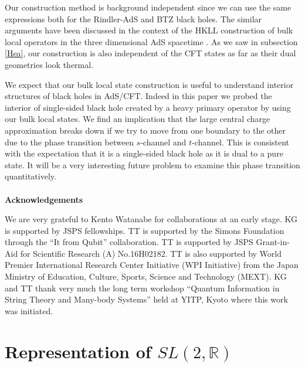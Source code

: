 \documentclass[11pt,a4paper]{article}
\begin{document}
Our construction method is background independent since we can use the same expressions both for the Rindler-AdS and BTZ black holes. The similar arguments have been discussed in the context of the HKLL construction of bulk local operators in the three dimensional AdS spacetime \cite{HKLL2}. As we saw in subsection \ref{Hea}, our construction is also independent of the CFT states as far as their dual geometries look thermal.

We expect that our bulk local state construction is useful to understand interior structures of black holes in AdS/CFT. Indeed in this paper we probed the interior of single-sided black hole created by a heavy primary operator by using our bulk local states. We find an implication that the large central charge approximation breaks down if we try to move from one boundary to the other due to the phase transition between $s$-channel and $t$-channel. This is consistent with the expectation that it is a single-sided black hole as it is dual to a pure state. It will be a very interesting future problem to examine this phase transition quantitatively.
\\ \\ 
 {\bf Acknowledgements}

We are very grateful to Kento Watanabe for collaborations at an early stage. KG is supported by JSPS fellowships. TT is supported by the Simons Foundation through the ``It from Qubit'' collaboration. TT is supported by JSPS Grant-in-Aid for Scientific Research (A) No.16H02182. TT is also supported by World Premier International Research Center Initiative (WPI Initiative) from the Japan Ministry of Education, Culture, Sports, Science and Technology (MEXT). KG and TT thank very much the long term workshop ``Quantum Information in String Theory and Many-body Systems'' held at YITP, Kyoto where this work was initiated.

\newpage
\appendix
\section{Representation of $SL(2,\mathbb{R})$}
\end{document}
